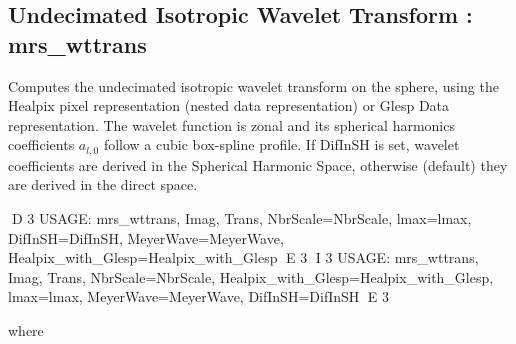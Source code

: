 \subsection{Undecimated Isotropic Wavelet Transform : mrs\_wttrans}
Computes the undecimated isotropic wavelet transform on the sphere, using the Healpix pixel representation (nested data representation) or 
Glesp Data representation. The wavelet function is zonal and its spherical harmonics coefficients $a_{l,0}$ follow a cubic box-spline profile. 
If DifInSH is set, wavelet coefficients are derived in the Spherical Harmonic Space, otherwise (default) they are derived in the direct space.
{\bf
\begin{center}
D 3
     USAGE: mrs\_wttrans, Imag, Trans, NbrScale=NbrScale, lmax=lmax, DifInSH=DifInSH, MeyerWave=MeyerWave, Healpix\_with\_Glesp=Healpix\_with\_Glesp 
E 3
I 3
     USAGE: mrs\_wttrans, Imag, Trans, NbrScale=NbrScale, Healpix\_with\_Glesp=Healpix\_with\_Glesp, lmax=lmax, MeyerWave=MeyerWave, DifInSH=DifInSH
E 3
\end{center}}
where 
